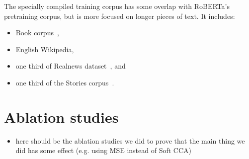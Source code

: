 The specially compiled training corpus has some overlap with RoBERTa's
pretraining corpus, but is more focused on longer pieces of text. It includes:

\begin{itemize}
  \item Book corpus~\cite{zhu2015aligning},
  \item English Wikipedia,
  \item one third of Realnews dataset~\cite{zellers2019defending}, and
  \item one third of the Stories corpus~\cite{trinh2018simple}.
\end{itemize}

\section{Ablation studies}

\begin{itemize}
    \item here should be the ablation studies we did to prove that the main
        thing we did has some effect (e.g. using MSE instead of Soft CCA)
\end{itemize}
